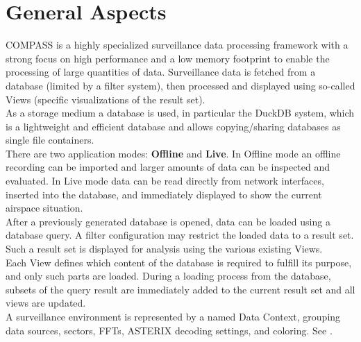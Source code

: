 \section{General Aspects}
COMPASS is a highly specialized surveillance data processing framework with a strong focus on high performance and a low memory footprint to enable the processing of large quantities of data. Surveillance data is fetched from a database (limited by a filter system), then processed and displayed using so-called Views (specific visualizations of the result set).\\

As a storage medium a database is used, in particular the DuckDB system, which is a lightweight and efficient database and allows copying/sharing databases as single file containers. \\

There are two application modes: \textbf{Offline} and \textbf{Live}. In Offline mode an offline recording can be imported and larger amounts of data can be inspected and evaluated. 
In Live mode data can be read directly from network interfaces, inserted into the database, and immediately displayed to show the current airspace situation. \\

After a previously generated database is opened, data can be loaded using a database query. A filter configuration may restrict the loaded data to a result set. 
Such a result set is displayed for analysis using the various existing Views.\\

Each View defines which content of the database is required to fulfill its purpose, and only such parts are loaded. During a loading process from the database, subsets of the query result are immediately added to the current result set and all views are updated.\\

A surveillance environment is represented by a named Data Context, grouping data sources, sectors, FFTs, ASTERIX decoding settings, and coloring. See . \\


